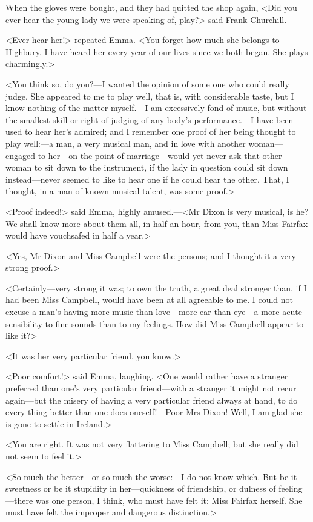 When the gloves were bought, and they had quitted the shop again, <Did you ever hear the young lady we were speaking of, play?> said Frank Churchill.

<Ever hear her!> repeated Emma. <You forget how much she belongs to Highbury. I have heard her every year of our lives since we both began. She plays charmingly.>

<You think so, do you?—I wanted the opinion of some one who could really judge. She appeared to me to play well, that is, with considerable taste, but I know nothing of the matter myself.—I am excessively fond of music, but without the smallest skill or right of judging of any body's performance.—I have been used to hear her's admired; and I remember one proof of her being thought to play well:—a man, a very musical man, and in love with another woman—engaged to her—on the point of marriage—would yet never ask that other woman to sit down to the instrument, if the lady in question could sit down instead—never seemed to like to hear one if he could hear the other. That, I thought, in a man of known musical talent, was some proof.>

<Proof indeed!> said Emma, highly amused.—<Mr Dixon is very musical, is he? We shall know more about them all, in half an hour, from you, than Miss Fairfax would have vouchsafed in half a year.>

<Yes, Mr Dixon and Miss Campbell were the persons; and I thought it a very strong proof.>

<Certainly—very strong it was; to own the truth, a great deal stronger than, if I had been Miss Campbell, would have been at all agreeable to me. I could not excuse a man's having more music than love—more ear than eye—a more acute sensibility to fine sounds than to my feelings. How did Miss Campbell appear to like it?>

<It was her very particular friend, you know.>

<Poor comfort!> said Emma, laughing. <One would rather have a stranger preferred than one's very particular friend—with a stranger it might not recur again—but the misery of having a very particular friend always at hand, to do every thing better than one does oneself!—Poor Mrs Dixon! Well, I am glad she is gone to settle in Ireland.>

<You are right. It was not very flattering to Miss Campbell; but she really did not seem to feel it.>

<So much the better—or so much the worse:—I do not know which. But be it sweetness or be it stupidity in her—quickness of friendship, or dulness of feeling—there was one person, I think, who must have felt it: Miss Fairfax herself. She must have felt the improper and dangerous distinction.>

